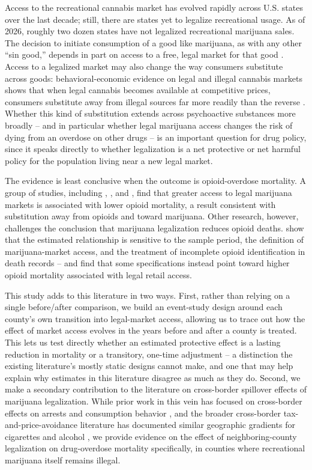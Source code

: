 \documentclass{article}
\begin{document}
Access to the recreational cannabis market has evolved rapidly across U.S. states over the last decade; still,
there are states yet to legalize recreational usage. As of 2026, roughly two dozen states have not legalized
recreational marijuana sales. The decision to initiate consumption of a good like marijuana, as with any other
``sin good,'' depends in part on access to a free, legal market for that good \citep{JacobiSovinsky2016}. Access to
a legalized market may also change the way consumers substitute across goods: behavioral-economic evidence on legal
and illegal cannabis markets shows that when legal cannabis becomes available at competitive prices, consumers
substitute away from illegal sources far more readily than the reverse \citep{AmlungMacKillop2019}. Whether this
kind of substitution extends across psychoactive substances more broadly -- and in particular whether legal
marijuana access changes the risk of dying from an overdose on other drugs -- is an important question for drug
policy, since it speaks directly to whether legalization is a net protective or net harmful policy for the
population living near a new legal market.

The evidence is least conclusive when the outcome is opioid-overdose mortality. A group of studies, including
\citet{PowellPaculaJacobson2018}, \citet{ChanBurkhardtFlyr2020}, and \citet{Denkyirah2026}, find that greater
access to legal marijuana markets is associated with lower opioid mortality, a result consistent with substitution
away from opioids and toward marijuana. Other research, however, challenges the conclusion that marijuana
legalization reduces opioid deaths. \citet{MathurRuhm2023} show that the estimated relationship is sensitive to the
sample period, the definition of marijuana-market access, and the treatment of incomplete opioid identification in
death records -- and find that some specifications instead point toward higher opioid mortality associated with
legal retail access.

This study adds to this literature in two ways. First, rather than relying on a single before/after comparison, we
build an event-study design around each county's own transition into legal-market access, allowing us to trace out
how the effect of market access evolves in the years before and after a county is treated. This lets us test
directly whether an estimated protective effect is a lasting reduction in mortality or a transitory, one-time
adjustment -- a distinction the existing literature's mostly static designs cannot make, and one that may help
explain why estimates in this literature disagree as much as they do. Second, we make a secondary contribution to
the literature on cross-border spillover effects of marijuana legalization. While prior work in this vein has
focused on cross-border effects on arrests and consumption behavior \citep{HaoCowan2020}, and the broader
cross-border tax-and-price-avoidance literature has documented similar geographic gradients for cigarettes and
alcohol \citep{Lovenheim2008,Beatty2009}, we provide evidence on the effect of neighboring-county legalization on
drug-overdose mortality specifically, in counties where recreational marijuana itself remains illegal.
\end{document}

